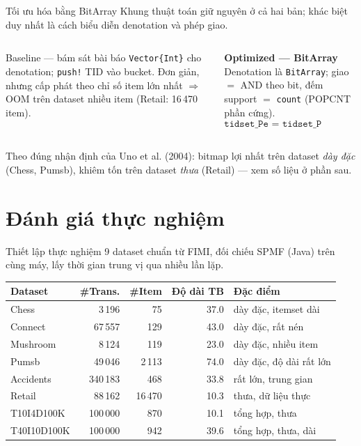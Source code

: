 \documentclass[9pt, aspectratio=169]{beamer}
\newcommand{\opt}[1]{\textcolor{optgreen}{\textbf{#1}}}
\begin{document}
\begin{frame}{Tối ưu hóa bằng BitArray}
  \small Khung thuật toán giữ nguyên ở cả hai bản; khác biệt duy nhất là
  cách biểu diễn denotation và phép giao.
  \begin{columns}[T]
    \begin{block}{Baseline — bám sát bài báo}
      \small \texttt{Vector\{Int\}} cho denotation; \texttt{push!} TID vào
      bucket. Đơn giản, nhưng cấp phát theo chỉ số item lớn nhất $\Rightarrow$
      OOM trên dataset nhiều item (Retail: 16\,470 item).
    \end{block}
    \begin{exampleblock}{\opt{Optimized — BitArray}}
      \small Denotation là \texttt{BitArray}; giao $=$ AND theo bit, đếm
      support $=$ \texttt{count} (POPCNT phần cứng).
      \[
        \texttt{tidset\_Pe = tidset\_P .\& tidsets\_full[e]}
      \]
    \end{exampleblock}
  \end{columns}
  \vspace{0.3em}
  \centering\small Theo đúng nhận định của Uno et al. (2004): bitmap lợi
  nhất trên dataset \emph{dày đặc} (Chess, Pumsb), khiêm tốn trên dataset
  \emph{thưa} (Retail) — xem số liệu ở phần sau.
\end{frame}

\section{Đánh giá thực nghiệm}

\begin{frame}{Thiết lập thực nghiệm}
  \small 9 dataset chuẩn từ FIMI, đối chiếu SPMF (Java) trên cùng máy, lấy
  thời gian trung vị qua nhiều lần lặp.
  \vspace{0.3em}
  \centering
  \begin{tabular}{l r r r l}
    \toprule
    \textbf{Dataset} & \textbf{\#Trans.} & \textbf{\#Item} & \textbf{Độ dài TB} & \textbf{Đặc điểm} \\
    \midrule
    Chess        & 3\,196    & 75      & 37.0 & dày đặc, itemset dài \\
    Connect      & 67\,557   & 129     & 43.0 & dày đặc, rất nén \\
    Mushroom     & 8\,124    & 119     & 23.0 & dày đặc, nhiều item \\
    Pumsb        & 49\,046   & 2\,113  & 74.0 & dày đặc, độ dài rất lớn \\
    Accidents    & 340\,183  & 468     & 33.8 & rất lớn, trung gian \\
    Retail       & 88\,162   & 16\,470 & 10.3 & thưa, dữ liệu thực \\
    T10I4D100K   & 100\,000  & 870     & 10.1 & tổng hợp, thưa \\
    T40I10D100K  & 100\,000  & 942     & 39.6 & tổng hợp, thưa, dài \\
    \bottomrule
  \end{tabular}
\end{frame}
\end{document}

